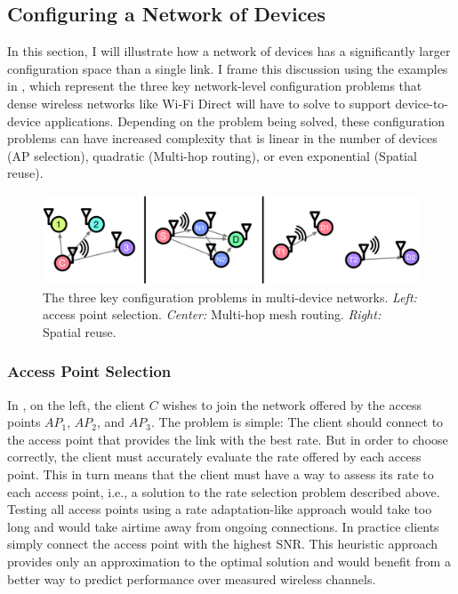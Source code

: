 \subsection{Configuring a Network of Devices}
\label{sec:intro_network_problems}
In this section, I will illustrate how a network of devices has a significantly larger configuration space than a single link. I frame this discussion using the examples in , which represent the three key network-level configuration problems that dense wireless networks like Wi-Fi Direct will have to solve to support device-to-device applications. Depending on the problem being solved, these configuration problems can have increased complexity that is linear in the number of devices (AP selection), quadratic (Multi-hop routing), or even exponential (Spatial reuse).

\begin{figure}[tp]
	\centering
	\includegraphics[width=\textwidth]{figures/network}
	\caption[The three key configuration problems in multi-device networks]{\label{fig:network_examples} The three key configuration problems in multi-device networks. \textit{Left:} access point selection. \textit{Center:} Multi-hop mesh routing. \textit{Right:} Spatial reuse. }
\end{figure}

\subsubsection{Access Point Selection}
In , on the left, the client $C$ wishes to join the network offered by the access points $AP_1$, $AP_2$, and $AP_3$. The  problem is simple: The client should connect to the access point that provides the link with the best rate. But in order to choose correctly, the client must accurately evaluate the rate offered by each access point. This in turn means that the client must have a way to assess its rate to each access point, i.e., a solution to the rate selection problem described above. Testing all access points using a rate adaptation-like approach would take too long and would take airtime away from ongoing connections. In practice clients simply connect the access point with the highest SNR\@. This heuristic approach provides only an approximation to the optimal solution and would benefit from a better way to predict performance over measured wireless channels.

